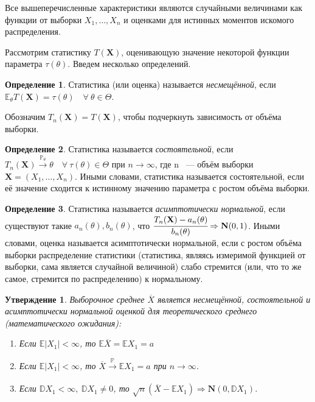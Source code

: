 \documentclass[oneside,final,14pt]{extreport}
\theoremstyle{plain}
\newtheorem*{thm*}{Утверждение}
\theoremstyle{definition}
\newtheorem*{defn}{Определение}
\theoremstyle{named}
\begin{document}
Все вышеперечисленные характеристики являются случайными величинами как функции от выборки $X_{1}, \ldots, X_{n}$ и оценками для истинных моментов искомого распределения.

Рассмотрим статистику $T(\mathbf{X})$, оценивающую значение некоторой функции параметра $\tau(\theta)$. Введем несколько определений.

\begin{defn}
    Статистика (или оценка) называется {\it несмещённой}, если $\mathbb{E}_{\theta}T(\mathbf{X}) = \tau(\theta) \quad \forall ~ \theta \in \Theta$.
\end{defn}

Обозначим $T_n(\mathbf{X}) = T(\mathbf{X})$, чтобы подчеркнуть зависимость от объёма выборки.

\begin{defn}
    Статистика называется {\it состоятельной}, если $T_n(\mathbf{X}) \stackrel{\mathbb{P}_{\theta}}{\longrightarrow} \theta \quad \forall ~ \tau(\theta) \in \Theta$ при $n \to \infty$, где n ~--- объём выборки $\mathbf{X} = \left(X_1, \ldots, X_n\right)$. 
    Иными словами, статистика называется состоятельной, если её значение сходится к истинному значению параметра с ростом объёма выборки.
\end{defn}

\begin{defn}
    Статистика называется { \it асимптотически нормальной}, если существуют такие $a_n(\theta), b_n(\theta)$, что $\cfrac{T_n(\mathbf{X}) - a_n(\theta)}{b_n(\theta)} \Rightarrow \mathbf{N}(0, 1)$.
    Иными словами, оценка называется асимптотически нормальной, если с ростом объёма выборки распределение статистики (статистика, являясь измеримой функцией от выборки, сама является случайной величиной) слабо стремится (или, что то же самое, стремится по распределению) к нормальному.
\end{defn}

\begin{thm*}
Выборочное среднее $\overline{X}$ является несмещённой, состоятельной и асимптотически нормальной оценкой для теоретического среднего (математического ожидания):

\begin{enumerate}[label={\arabic*.}]
    \item Если $\mathbb{E}|X_{1}|<\infty$, то $\mathbb{E}\overline{X}=\mathbb{E} X_{1}=a$
    \item Если $\mathbb{E}|X_{1}|<\infty$, то $\overline{X} \xrightarrow[]{\mathbb{P}} \mathbb{E} X_{1}=a$ при $n \rightarrow \infty$.
    \item Если $\mathbb{D} X_{1}<\infty,~ \mathbb{D} X_{1} \neq 0$, то $\sqrt{n}(\overline{X}-\mathbb{E} X_{1}) \Rightarrow \mathbf{N}(0, \mathbb{D} X_{1})$.
\end{enumerate}
\end{thm*}
\end{document}
